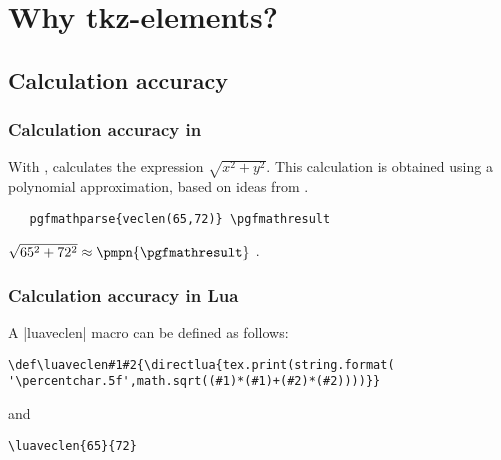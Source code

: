 \newpage
\section{Why tkz-elements?} %
\label{sec:why_tkz_elements}

\subsection{Calculation accuracy} %
\label{sub:calculation_accuracy}

\subsubsection{Calculation accuracy in \TIKZ} %
\label{ssub:calculation_accuracy_in_tikz}

With \TIKZ,  calculates the expression $\sqrt{x^2+y^2}$.
This calculation is obtained using a polynomial approximation, based on ideas from .

  
\begin{mybox}{}
\begin{verbatim}
   pgfmathparse{veclen(65,72)} \pgfmathresult
\end{verbatim}
\end{mybox}

 \tkzHand $\sqrt{65^2+72^2} \approx \pmpn{\pgfmathresult} $ \tkzRBomb.

\subsubsection{Calculation accuracy in Lua} %
\label{ssub:calculation_accuracy_in_lua}

A |luaveclen| macro can be defined as follows:

\begin{mybox}{}
\begin{verbatim}
\def\luaveclen#1#2{\directlua{tex.print(string.format(
'\percentchar.5f',math.sqrt((#1)*(#1)+(#2)*(#2))))}}
\end{verbatim}
\end{mybox}

and

\begin{mybox}
\begin{verbatim}
\luaveclen{65}{72}
\end{verbatim}
\end{mybox}

